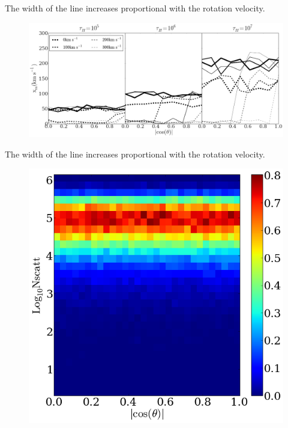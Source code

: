 \documentclass{beamer}
\begin{document}
\begin{frame}{The width of the line increases proportional with the rotation velocity.}
\begin{figure}
\includegraphics[scale=0.16]{Figures/f8.png}
\end{figure}
\end{frame}

\begin{frame}{The width of the line increases proportional with the rotation velocity.}
\begin{figure}
\includegraphics[scale=0.16]{Figures/f9h.png}
\end{figure}
\end{frame}
\end{document}
